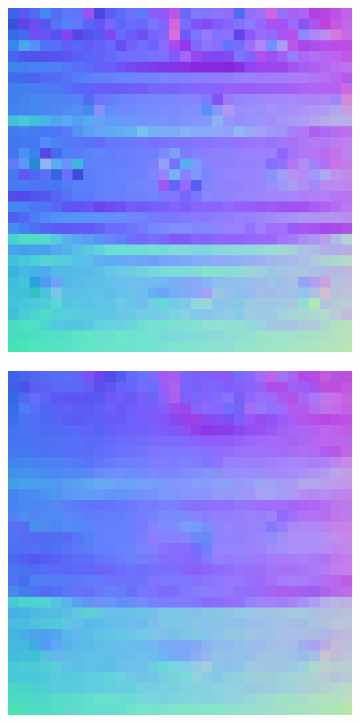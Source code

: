 \begin{figure}
\begin{subfigure}[b]{0.19\linewidth}
	\end{subfigure}
	\begin{subfigure}[b]{0.19\linewidth}
		\includegraphics[width=\linewidth]{./Figures/gcnn_synthetic/eval_2_normal_GT.png}
	\end{subfigure}
	\begin{subfigure}[b]{0.19\linewidth}
		\includegraphics[width=\linewidth]{./Figures/gcnn_synthetic/eval_2_normal_an2-8-1000.png}

\end{subfigure}
\end{figure}
